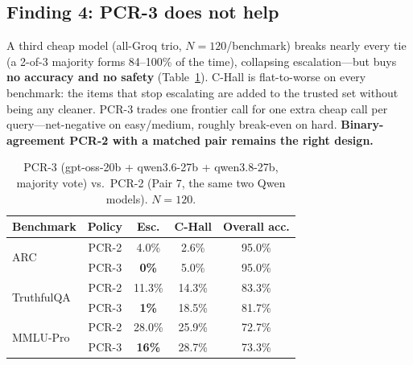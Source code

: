 \documentclass[conference]{IEEEtran}
\begin{document}
\subsection{Finding 4: PCR-3 does not help}
A third cheap model (all-Groq trio, $N=120$/benchmark) breaks nearly every tie
(a 2-of-3 majority forms 84--100\% of the time), collapsing escalation---but
buys \textbf{no accuracy and no safety} (Table~\ref{tab:pcr3}). C-Hall is
flat-to-worse on every benchmark: the items that stop escalating are added to
the trusted set without being any cleaner. PCR-3 trades one frontier call for
one extra cheap call per query---net-negative on easy/medium, roughly
break-even on hard. \textbf{Binary-agreement PCR-2 with a matched pair remains
the right design.}

\begin{table}[!t]
\caption{PCR-3 (gpt-oss-20b + qwen3.6-27b + qwen3.8-27b, majority vote) vs.\
PCR-2 (Pair 7, the same two Qwen models). $N=120$.}
\label{tab:pcr3}
\renewcommand{\arraystretch}{1.2}
\begin{tabular}{l c c c c}
\toprule
\textbf{Benchmark} & \textbf{Policy} & \textbf{Esc.} & \textbf{C-Hall} & \textbf{Overall acc.} \\
\midrule
\multirow{2}{*}{ARC} & PCR-2 & 4.0\% & 2.6\% & 95.0\% \\
 & PCR-3 & \textbf{0\%} & 5.0\% & 95.0\% \\
\multirow{2}{*}{TruthfulQA} & PCR-2 & 11.3\% & 14.3\% & 83.3\% \\
 & PCR-3 & \textbf{1\%} & 18.5\% & 81.7\% \\
\multirow{2}{*}{MMLU-Pro} & PCR-2 & 28.0\% & 25.9\% & 72.7\% \\
 & PCR-3 & \textbf{16\%} & 28.7\% & 73.3\% \\
\bottomrule
\end{tabular}
\end{table}
\end{document}
